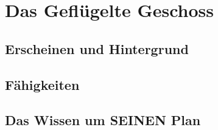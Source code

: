 \section{Das Geflügelte Geschoss}

\subsection{Erscheinen und Hintergrund}

\subsection{Fähigkeiten}

\subsection{Das Wissen um SEINEN Plan}